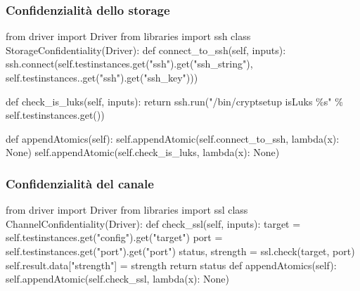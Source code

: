 \documentclass[../main.tex]{subfiles}
\begin{document}
\subsubsection{Confidenzialità dello storage}
\begin{python}
from driver import Driver
from libraries import ssh
class StorageConfidentiality(Driver):
    def connect_to_ssh(self, inputs):
    ssh.connect(self.testinstances.get("ssh").get("ssh_string"), self.testinstances..get("ssh").get("ssh_key")))
    
    def check_is_luks(self, inputs):
        return ssh.run("/bin/cryptsetup isLuks \%s" \% self.testinstances.get())

    def appendAtomics(self):
        self.appendAtomic(self.connect_to_ssh, lambda(x): None)
        self.appendAtomic(self.check_is_luks, lambda(x): None)

\end{python}

\subsubsection{Confidenzialità del canale}

\begin{python}
from driver import Driver
from libraries import ssl
class ChannelConfidentiality(Driver):
    def check_ssl(self, inputs):
        target = self.testinstances.get("config").get("target")
        port = self.testinstances.get("port").get("port")
        status, strength =  ssl.check(target, port)
        self.result.data["strength"] = strength
        return status
    def appendAtomics(self):
        self.appendAtomic(self.check_ssl, lambda(x): None)

\end{python}
\end{document}
